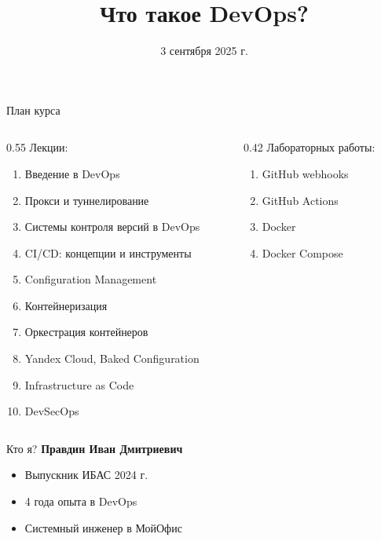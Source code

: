 \documentclass[aspectratio=169]{beamer}
\title{Что такое DevOps?}
\date{3 сентября 2025 г.}
\begin{document}
    \maketitle

    \begin{frame}{План курса}
        \begin{columns}[t]
            \begin{column}[t]{0.55\textwidth}
                Лекции:
                \begin{enumerate}
                    \item Введение в DevOps
                    \item Прокси и туннелирование
                    \item Системы контроля версий в DevOps
                    \item CI/CD: концепции и инструменты
                    \item Configuration Management
                    \item Контейнеризация
                    \item Оркестрация контейнеров
                    \item Yandex Cloud, Baked Configuration
                    \item Infrastructure as Code
                    \item DevSecOps
                \end{enumerate}
            \end{column}
            \begin{column}[t]{0.42\textwidth}
                Лабораторных работы:
                \begin{enumerate}
                    \item GitHub webhooks
                    \item GitHub Actions
                    \item Docker
                    \item Docker Compose
                \end{enumerate}
            \end{column}
        \end{columns}
    \end{frame}

    \begin{frame}{Кто я?}
        \textbf{Правдин Иван Дмитриевич}
        \begin{itemize}
            \item Выпускник ИБАС 2024 г.
            \item 4 года опыта в DevOps
            \item Системный инженер в МойОфис
        \end{itemize}
    \end{frame}
\end{document}

